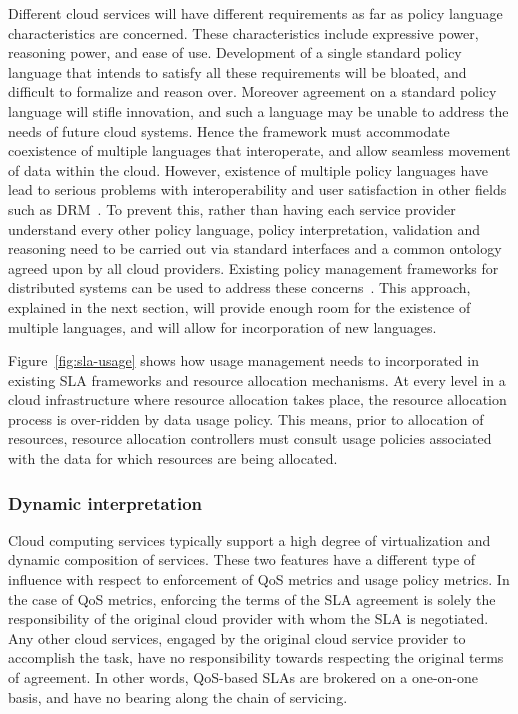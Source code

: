\documentclass[notitlepage]{book}
\begin{document}
\begin{doublespace}
Different cloud services will have different requirements as far as policy language characteristics are concerned. These characteristics  include expressive power, reasoning power, and ease of use. Development of  a single standard policy language that intends to satisfy all these requirements will be bloated, and difficult to formalize and reason over. Moreover agreement on a standard policy language will stifle innovation, and such a  language may be unable to address the needs of  future cloud systems. Hence the framework must accommodate coexistence of multiple languages that interoperate, and allow seamless movement of data within the cloud. However, existence of multiple policy languages have lead to serious problems with interoperability and user satisfaction in other fields such as DRM~\cite{JaHeMa:06}. To prevent this, rather than having each service provider understand every other policy language, policy interpretation, validation and reasoning need to be carried out via standard interfaces and a common ontology agreed upon by all cloud providers. Existing policy management frameworks for distributed systems can be used to address these concerns~\cite{DaDuLuSl:01,JaHeLa:10}. This approach, explained in the next section, will provide enough room for the existence of multiple languages, and will allow for incorporation of new languages. 

Figure~\ref{fig:sla-usage} shows how usage management needs to incorporated in existing SLA frameworks and resource allocation mechanisms. At every level in a cloud infrastructure where resource allocation takes place, the resource allocation process is over-ridden by data usage policy. This means, prior to allocation of resources,  resource allocation controllers must consult usage policies associated with the data for which resources are being allocated. 

\subsubsection{Dynamic interpretation}
Cloud computing services typically support a high degree of virtualization and dynamic composition of services. These two features have a different type of influence with respect to enforcement of QoS metrics and usage policy metrics. In the case of QoS metrics, enforcing the terms of the SLA agreement is solely the responsibility of the original cloud provider with whom the SLA is negotiated. Any other cloud services, engaged by the original cloud service provider to accomplish the task, have no responsibility towards respecting the original terms of agreement. In other words, QoS-based SLAs are brokered on a one-on-one basis, and have no bearing along the chain of servicing. 


\end{doublespace}
\end{document}

